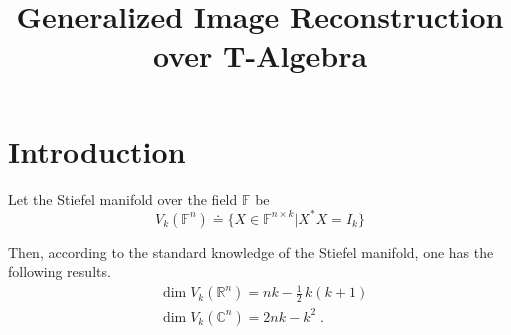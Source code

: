 \documentclass[conference,onecolumn]{IEEEtran}
\begin{document}
\title{\huge \bf Generalized Image Reconstruction over T-Algebra
}

\author{
}


\maketitle


%

\newcommand\mynormal[1]{
\scalebox{1}{$#1$}
}

\section{Introduction}

Let the Stiefel manifold over the field $\mathbb{F}$ be 
\begin{equation}
V_{k}(\mathbb{F}^{n}) \doteq \{X \in \mathbb{F}^{n\times k} | X^{*} X = I_{k}  \}
\end{equation}

Then, according to the standard knowledge of the Stiefel manifold, one has the following results.
\begin{equation} 
\begin{aligned}
&\operatorname{dim} V_{k}(\mathbb{R}^{n}) = nk - \frac{1}{2}\,  k(k+1) \; \\ 
&\operatorname{dim} V_{k}(\mathbb{C}^{n}) = 2nk - k^{2} \;.
\end{aligned}
\end{equation}
\end{document}

